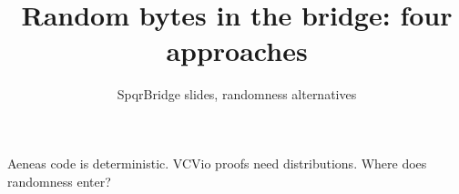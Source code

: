 

\title{Random bytes in the bridge: four approaches}
\subtitle{SpqrBridge slides, randomness alternatives}

\newcommand{\source}[1]{{\footnotesize\textcolor{trustc}{#1}}\par\vspace{0.2em}}
\newcommand{\slidenote}[1]{\par\vspace{0.6em}\centering{\footnotesize #1}\par}
\newcommand{\pro}{\textcolor{proofc}{\textbf{+}}}
\newcommand{\con}{\textcolor{gapc}{\textbf{--}}}
\newcommand{\yes}{\textcolor{proofc}{\textbf{yes}}}
\newcommand{\no}{\textcolor{gapc}{\textbf{no}}}
\newcommand{\proscons}[2]{%
  \raggedright
  \begin{columns}[T]
    \column{0.42\textwidth}\footnotesize
    \textbf{\textcolor{proofc}{For}}\\[0.3em] #1
    \column{0.42\textwidth}\footnotesize
    \textbf{\textcolor{gapc}{Against}}\\[0.3em] #2
  \end{columns}}



\begin{frame}
  \titlepage
  \centering
  {\footnotesize\textcolor{trustc}{Aeneas code is deterministic. VCVio proofs need
  distributions. Where does randomness enter?}}
\end{frame}

